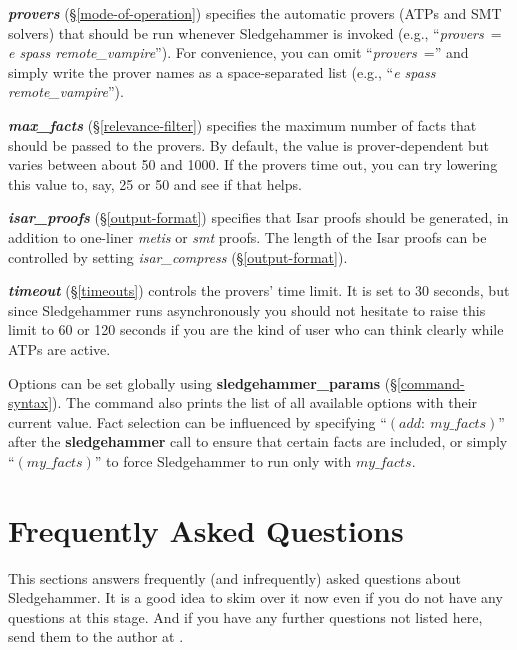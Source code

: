 \documentclass[a4paper,12pt]{article}
\begin{document}
\begin{enum}
\item[\labelitemi] \textbf{\textit{provers}} (\S\ref{mode-of-operation}) specifies
the automatic provers (ATPs and SMT solvers) that should be run whenever
Sledgehammer is invoked (e.g., ``\textit{provers}~= \textit{e spass
remote\_vampire\/}''). For convenience, you can omit ``\textit{provers}~=''
and simply write the prover names as a space-separated list (e.g., ``\textit{e
spass remote\_vampire\/}'').

\item[\labelitemi] \textbf{\textit{max\_facts}} (\S\ref{relevance-filter})
specifies the maximum number of facts that should be passed to the provers. By
default, the value is prover-dependent but varies between about 50 and 1000. If
the provers time out, you can try lowering this value to, say, 25 or 50 and see
if that helps.

\item[\labelitemi] \textbf{\textit{isar\_proofs}} (\S\ref{output-format}) specifies
that Isar proofs should be generated, in addition to one-liner \textit{metis} or
\textit{smt} proofs. The length of the Isar proofs can be controlled by setting
\textit{isar\_compress} (\S\ref{output-format}).

\item[\labelitemi] \textbf{\textit{timeout}} (\S\ref{timeouts}) controls the
provers' time limit. It is set to 30 seconds, but since Sledgehammer runs
asynchronously you should not hesitate to raise this limit to 60 or 120 seconds
if you are the kind of user who can think clearly while ATPs are active.
\end{enum}

Options can be set globally using \textbf{sledgehammer\_params}
(\S\ref{command-syntax}). The command also prints the list of all available
options with their current value. Fact selection can be influenced by specifying
``$(\textit{add}{:}~\textit{my\_facts})$'' after the \textbf{sledgehammer} call
to ensure that certain facts are included, or simply ``$(\textit{my\_facts})$''
to force Sledgehammer to run only with $\textit{my\_facts}$.

\section{Frequently Asked Questions}
\label{frequently-asked-questions}

This sections answers frequently (and infrequently) asked questions about
Sledgehammer. It is a good idea to skim over it now even if you do not have any
questions at this stage. And if you have any further questions not listed here,
send them to the author at \authoremail.
\end{document}
